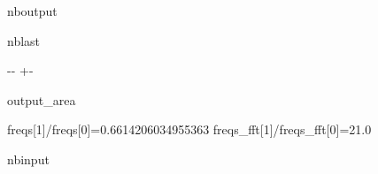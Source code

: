 \documentclass[letterpaper,10pt,english]{sphinxmanual}
\begin{document}
\begin{sphinxuseclass}{nboutput}
\begin{sphinxuseclass}{nblast}
{

\kern-\sphinxverbatimsmallskipamount\kern-\baselineskip
\kern+\FrameHeightAdjust\kern-\fboxrule
\vspace{\nbsphinxcodecellspacing}

\begin{sphinxuseclass}{output_area}
\begin{sphinxuseclass}{}


\begin{sphinxVerbatim}[commandchars=\\\{\}]
freqs[1]/freqs[0]=0.6614206034955363
freqs\_fft[1]/freqs\_fft[0]=21.0
\end{sphinxVerbatim}



\end{sphinxuseclass}
\end{sphinxuseclass}
}

\end{sphinxuseclass}
\end{sphinxuseclass}
\begin{sphinxuseclass}{nbinput}
{
\begin{sphinxVerbatim}[commandchars=\\\{\}]
\llap{\color{nbsphinxin}[8]:\,\hspace{\fboxrule}\hspace{\fboxsep}}\PYG{p}{[}\PYG{p}{]}

\end{sphinxVerbatim}
}

\end{sphinxuseclass}
\end{document}
